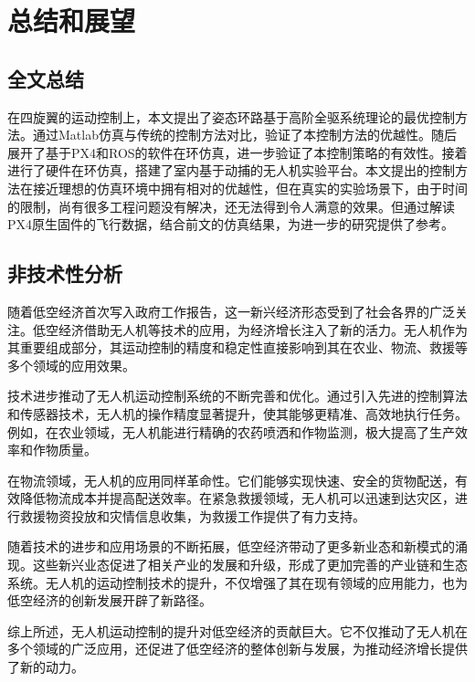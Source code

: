 
\chapter{总结和展望}
\section{全文总结}
在四旋翼的运动控制上，本文提出了姿态环路基于高阶全驱系统理论的最优控制方法。通过Matlab仿真与传统的控制方法对比，验证了本控制方法的优越性。随后展开了基于PX4和ROS的软件在环仿真，进一步验证了本控制策略的有效性。接着进行了硬件在环仿真，搭建了室内基于动捕的无人机实验平台。本文提出的控制方法在接近理想的仿真环境中拥有相对的优越性，但在真实的实验场景下，由于时间的限制，尚有很多工程问题没有解决，还无法得到令人满意的效果。但通过解读PX4原生固件的飞行数据，结合前文的仿真结果，为进一步的研究提供了参考。
\section{非技术性分析}
随着低空经济首次写入政府工作报告，这一新兴经济形态受到了社会各界的广泛关注。低空经济借助无人机等技术的应用，为经济增长注入了新的活力。无人机作为其重要组成部分，其运动控制的精度和稳定性直接影响到其在农业、物流、救援等多个领域的应用效果。

技术进步推动了无人机运动控制系统的不断完善和优化。通过引入先进的控制算法和传感器技术，无人机的操作精度显著提升，使其能够更精准、高效地执行任务。例如，在农业领域，无人机能进行精确的农药喷洒和作物监测，极大提高了生产效率和作物质量。

在物流领域，无人机的应用同样革命性。它们能够实现快速、安全的货物配送，有效降低物流成本并提高配送效率。在紧急救援领域，无人机可以迅速到达灾区，进行救援物资投放和灾情信息收集，为救援工作提供了有力支持。

随着技术的进步和应用场景的不断拓展，低空经济带动了更多新业态和新模式的涌现。这些新兴业态促进了相关产业的发展和升级，形成了更加完善的产业链和生态系统。无人机的运动控制技术的提升，不仅增强了其在现有领域的应用能力，也为低空经济的创新发展开辟了新路径。

综上所述，无人机运动控制的提升对低空经济的贡献巨大。它不仅推动了无人机在多个领域的广泛应用，还促进了低空经济的整体创新与发展，为推动经济增长提供了新的动力。
